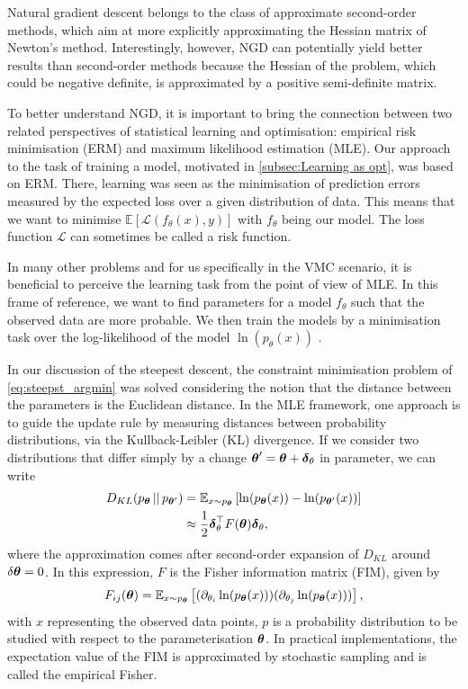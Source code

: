 Natural gradient descent belongs to the class of approximate second-order methods, which aim at more explicitly approximating the Hessian matrix of Newton's method. Interestingly, however, NGD can potentially yield better results than second-order methods \cite{wu2019logan} because the Hessian of the problem, which could be negative definite, is approximated by a positive semi-definite matrix.

To better understand NGD, it is important to bring the connection between two related perspectives of statistical learning and optimisation: empirical risk minimisation (ERM) and maximum likelihood estimation (MLE). Our approach to the task of training a model, motivated in \ref{subsec:Learning as opt}, was based on ERM. There, learning was seen as the minimisation of prediction errors measured by the expected loss over a given distribution of data. This means that we want to minimise $\mathbb{E}[\mathcal{L}(f_{\theta}(x), y)]$ with $f_{\theta}$ being our model. The loss function $\mathcal{L}$ can sometimes be called a risk function.

In many other problems and for us specifically in the VMC scenario, it is beneficial to perceive the learning task from the point of view of MLE. In this frame of reference, we want to find parameters for a model $f_\theta$ such that the observed data are more probable. We then train the models by a minimisation task over the log-likelihood of the model $\ln{(p_\theta(x))}$ \cite{hastie2009elements}. 

In our discussion of the steepest descent, the constraint minimisation problem of \eqref{eq:steepst_argmin} was solved considering the notion that the distance between the parameters is the Euclidean distance. In the MLE framework, one approach is to guide the update rule by measuring distances between probability distributions, via the Kullback-Leibler (KL) divergence. If we consider two distributions that differ simply by a change $\boldsymbol{\theta}' = \boldsymbol{\theta} + \boldsymbol{\delta}_\theta$ in parameter, we can write
\begin{align*}
D_{KL}(p_{\boldsymbol{\theta}} \, || \, p_{\boldsymbol{\theta}'}) &= \mathbb{E}_{x \sim p_{\boldsymbol{\theta}}}\left[\ln(p_{\boldsymbol{\theta}} (x)) - \ln(p_{\boldsymbol{\theta}'}(x)) \right] \\ &\approx \frac{1}{2}\boldsymbol{\delta}^\top_\theta F(\boldsymbol{\theta}) \boldsymbol{\delta}_\theta,
\end{align*}
where the approximation comes after second-order expansion of $D_{KL}$ around $\delta \boldsymbol{\theta} = 0$. In this expression, $F$ is the Fisher information matrix (FIM), given by
\begin{equation}
F_{ij}(\boldsymbol{\theta}) = \mathbb{E}_{x \sim p_{\boldsymbol{\theta}}}\left[(\partial_{\theta_i} \ln(p_{\boldsymbol{\theta}}(x)))(\partial_{\theta_j} \ln(p_{\boldsymbol{\theta}}(x)))\right],
\label{eq:FIM}
\end{equation}
with $x$ representing the observed data points, $p$ is a probability distribution to be studied with respect to the parameterisation $\boldsymbol{\theta}$.
In practical implementations, the expectation value of the FIM is approximated by stochastic sampling and is called the empirical Fisher.


